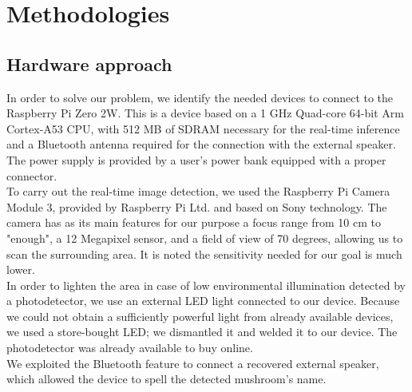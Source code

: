 \documentclass[conference]{IEEEtran}
\begin{document}
\section{Methodologies}

\subsection{Hardware approach}
In order to solve our problem, we identify the needed devices to connect to the Raspberry Pi Zero 2W. This is a device based on a 1 GHz Quad-core 64-bit Arm Cortex-A53 CPU, with 512 MB of SDRAM necessary for the real-time inference and a Bluetooth antenna required for the connection with the external speaker. The power supply is provided by a user's power bank equipped with a proper connector.\\
To carry out the real-time image detection, we used the Raspberry Pi Camera Module 3, provided by Raspberry Pi Ltd. and based on Sony technology. The camera has as its main features for our purpose a focus range from 10 cm to "enough", a 12 Megapixel sensor, and a field of view of 70 degrees, allowing us to scan the surrounding area. It is noted the sensitivity needed for our goal is much lower.\\
In order to lighten the area in case of low environmental illumination detected by a photodetector, we use an external LED light connected to our device. Because we could not obtain a sufficiently powerful light from already available devices, we used a store-bought LED; we dismantled it and welded it to our device. The photodetector was already available to buy online.\\
We exploited the Bluetooth feature to connect a recovered external speaker, which allowed the device to spell the detected mushroom's name.
\end{document}
